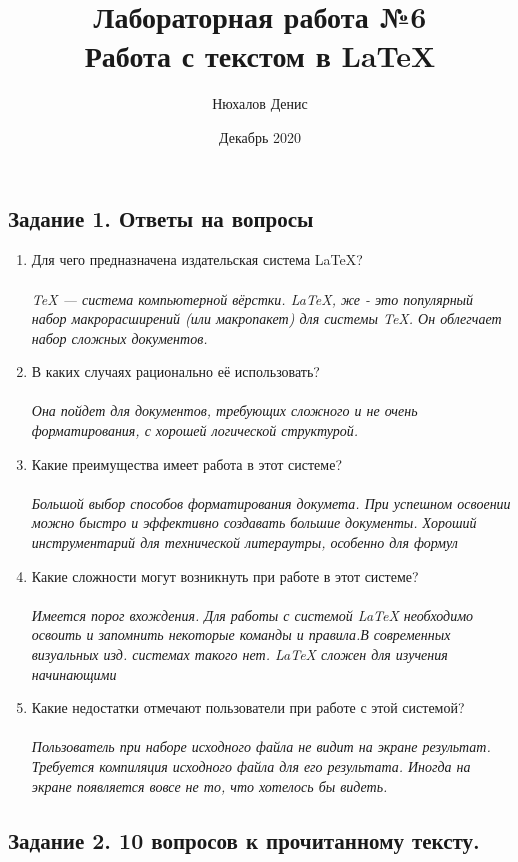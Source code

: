 \documentclass[a4paper,12pt]{article} %
\author{Нюхалов Денис}
\title{Лабораторная работа №6\\Работа с текстом в \LaTeX{}}
\date{Декабрь 2020}
\begin{document}

\maketitle
\newpage
\begin{center}
    \section{Задание 1. Ответы на вопросы}
\end{center}
\begin{enumerate}
    \item Для чего предназначена издательская система \LaTeX{}?\\\\
    \textit{TeX — система компьютерной вёрстки. \LaTeX{}, же - это популярный набор макрорасширений (или макропакет) для системы TeX. Он облегчает набор сложных документов.}
    \item В каких случаях рационально её использовать?\\\\
    \textit{Она пойдет для документов, требующих сложного и не очень форматирования, с хорошей логической структурой.}  
    \item Какие преимущества имеет работа в этот системе?\\\\
    \textit{Большой выбор способов форматирования докумета. При успешном освоении можно быстро и эффективно создавать большие документы. Хороший инструментарий для технической литераутры, особенно для формул}
    \item Какие сложности могут возникнуть при работе в этот системе?\\\\
    \textit{Имеется порог вхождения. Для работы с системой \LaTeX{} необходимо освоить и запомнить некоторые команды и правила.В современных визуальных изд. системах такого нет. \LaTeX{} сложен для изучения начинающими}
    \item Какие недостатки отмечают пользователи при работе с этой системой?\\\\
    \textit{Пользователь при наборе исходного файла не видит на экране результат. Требуется компиляция исходного файла для его результата. Иногда на экране появляется вовсе не то, что хотелось бы видеть.}
    
\end{enumerate}
\newpage
\begin{center}
  \section{Задание 2. 10 вопросов к прочитанному тексту.}  
\end{center}
\end{document}
